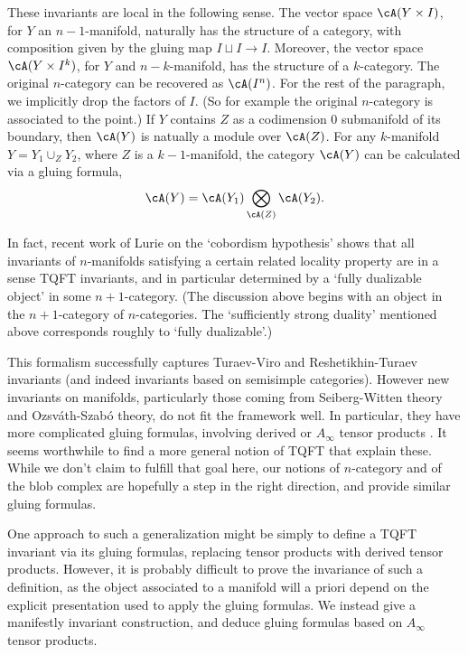 \documentclass{pnastwo}
\begin{document}
\begin{article}
These invariants are local in the following sense.
The vector space $\cA(Y \times I)$, for $Y$ an $n-1$-manifold,
naturally has the structure of a category, with composition given by the gluing map
$I \sqcup I \to I$. Moreover, the vector space $\cA(Y \times I^k)$,
for $Y$ and $n-k$-manifold, has the structure of a $k$-category.
The original $n$-category can be recovered as $\cA(I^n)$.
For the rest of the paragraph, we implicitly drop the factors of $I$.
(So for example the original $n$-category is associated to the point.)
If $Y$ contains $Z$ as a codimension $0$ submanifold of its boundary,
then $\cA(Y)$ is natually a module over $\cA(Z)$. For any $k$-manifold
$Y = Y_1 \cup_Z Y_2$, where $Z$ is a $k-1$-manifold, the category
$\cA(Y)$ can be calculated via a gluing formula,
$$\cA(Y) = \cA(Y_1) \Tensor_{\cA(Z)} \cA(Y_2).$$

In fact, recent work of Lurie on the `cobordism hypothesis' \cite{0905.0465}
shows that all invariants of $n$-manifolds satisfying a certain related locality property
are in a sense TQFT invariants, and in particular determined by
a `fully dualizable object' in some $n+1$-category.
(The discussion above begins with an object in the $n+1$-category of $n$-categories.
The `sufficiently strong duality' mentioned above corresponds roughly to `fully dualizable'.)

This formalism successfully captures Turaev-Viro and Reshetikhin-Turaev invariants
(and indeed invariants based on semisimple categories).
However new invariants on manifolds, particularly those coming from
Seiberg-Witten theory and Ozsv\'{a}th-Szab\'{o} theory, do not fit the framework well.
In particular, they have more complicated gluing formulas, involving derived or
$A_\infty$ tensor products \cite{1003.0598,1005.1248}.
It seems worthwhile to find a more general notion of TQFT that explain these.
While we don't claim to fulfill that goal here, our notions of $n$-category and
of the blob complex are hopefully a step in the right direction,
and provide similar gluing formulas.

One approach to such a generalization might be simply to define a
TQFT invariant via its gluing formulas, replacing tensor products with
derived tensor products. However, it is probably difficult to prove
the invariance of such a definition, as the object associated to a manifold
will a priori depend on the explicit presentation used to apply the gluing formulas.
We instead give a manifestly invariant construction, and
deduce gluing formulas based on $A_\infty$ tensor products.


\end{article}
\end{document}
